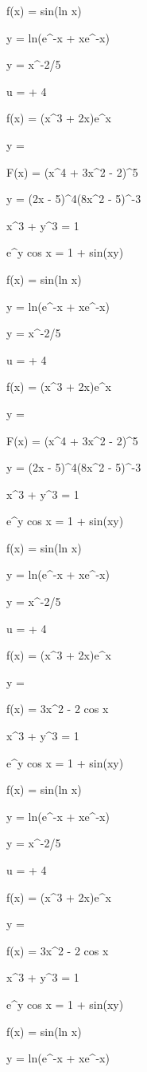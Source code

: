 \documentclass[11pt,a4paper]{article}
\begin{document}
 f(x) = sin(ln x)

 y = ln(e^{-x} + xe^{-x})

y = x^{-2/5}

u =  + 4

f(x) = (x^3 + 2x)e^x

y = 

 F(x) = (x^4 + 3x^2 - 2)^5

 y = (2x - 5)^4(8x^2 - 5)^{-3}

 x^3 + y^3 = 1

 e^y cos x = 1 + sin(xy)

 f(x) = sin(ln x)

 y = ln(e^{-x} + xe^{-x})

y = x^{-2/5}

u =  + 4

f(x) = (x^3 + 2x)e^x

y = 

 F(x) = (x^4 + 3x^2 - 2)^5

 y = (2x - 5)^4(8x^2 - 5)^{-3}

 x^3 + y^3 = 1

 e^y cos x = 1 + sin(xy)

 f(x) = sin(ln x)

 y = ln(e^{-x} + xe^{-x})

y = x^{-2/5}

u =  + 4

f(x) = (x^3 + 2x)e^x

y = 

f(x) = 3x^2 - 2 cos x


 x^3 + y^3 = 1

 e^y cos x = 1 + sin(xy)

 f(x) = sin(ln x)

 y = ln(e^{-x} + xe^{-x})

y = x^{-2/5}

u =  + 4

f(x) = (x^3 + 2x)e^x

y = 

f(x) = 3x^2 - 2 cos x


 x^3 + y^3 = 1

 e^y cos x = 1 + sin(xy)

 f(x) = sin(ln x)

 y = ln(e^{-x} + xe^{-x})
\end{document}
